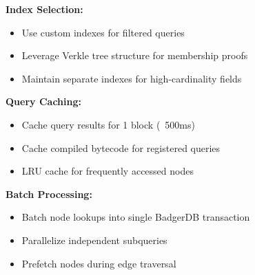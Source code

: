 \documentclass[11pt,a4paper]{article}
\begin{document}
\textbf{Index Selection:}
\begin{itemize}
\item Use custom indexes for filtered queries
\item Leverage Verkle tree structure for membership proofs
\item Maintain separate indexes for high-cardinality fields
\end{itemize}

\textbf{Query Caching:}
\begin{itemize}
\item Cache query results for 1 block (~500ms)
\item Cache compiled bytecode for registered queries
\item LRU cache for frequently accessed nodes
\end{itemize}

\textbf{Batch Processing:}
\begin{itemize}
\item Batch node lookups into single BadgerDB transaction
\item Parallelize independent subqueries
\item Prefetch nodes during edge traversal
\end{itemize}
\end{document}
